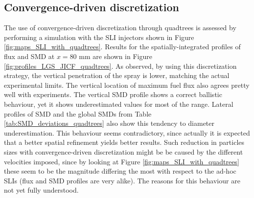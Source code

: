 %
%


\subsection{Convergence-driven discretization}

The use of convergence-driven discretization through quadtrees is assessed by performing a simulation with the SLI injectors shown in Figure \ref{fig:maps_SLI_with_quadtrees}. Results for the spatially-integrated profiles of flux and SMD at $x = 80$ mm  are shown in Figure \ref{fig:profiles_LGS_JICF_quadtrees}. As observed, by using this discretization strategy, the vertical penetration of the spray is lower, matching the actual experimental limits. The vertical location of maximum fuel flux also agrees pretty well with experiments. The vertical SMD profile shows a correct ballistic behaviour, yet it shows underestimated values for most of the range. Lateral profiles of SMD and the global SMDs from Table \ref{tab:SMD_deviations_quadtrees} also show this tendency to diameter underestimation. This behaviour seems contradictory, since actually it is expected that a better spatial refinement yields better results. Such reduction in particles sizes with convergence-driven discretization might be be caused by the different velocities imposed, since by looking at Figure \ref{fig:maps_SLI_with_quadtrees} these seem to be the magnitude differing the most with respect to the ad-hoc SLIs (flux and SMD profiles are very alike). The reasons for this behaviour are not yet fully understood. %

